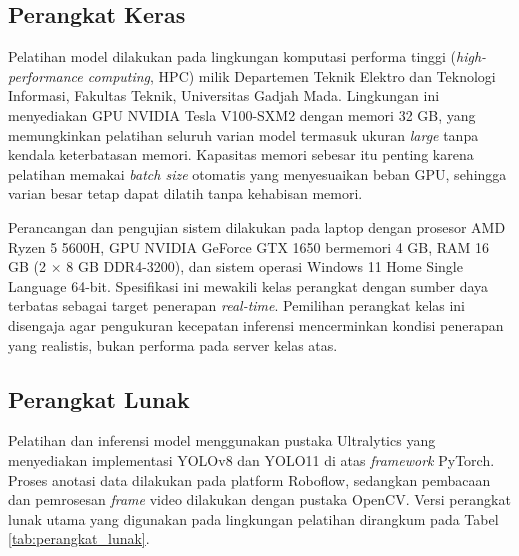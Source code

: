 \subsection{Perangkat Keras}

Pelatihan model dilakukan pada lingkungan komputasi performa tinggi 
(\textit{high-performance computing}, HPC) milik Departemen Teknik Elektro dan Teknologi 
Informasi, Fakultas Teknik, Universitas Gadjah Mada. Lingkungan ini menyediakan GPU NVIDIA 
Tesla V100-SXM2 dengan memori 32 GB, yang memungkinkan pelatihan seluruh varian model 
termasuk ukuran \textit{large} tanpa kendala keterbatasan memori. Kapasitas memori sebesar 
itu penting karena pelatihan memakai \textit{batch size} otomatis yang menyesuaikan beban 
GPU, sehingga varian besar tetap dapat dilatih tanpa kehabisan memori.

Perancangan dan pengujian sistem dilakukan pada laptop dengan prosesor AMD Ryzen 5 5600H, 
GPU NVIDIA GeForce GTX 1650 bermemori 4 GB, RAM 16 GB (2 $\times$ 8 GB DDR4-3200), dan 
sistem operasi Windows 11 Home Single Language 64-bit. Spesifikasi ini mewakili kelas 
perangkat dengan sumber daya terbatas sebagai target penerapan \textit{real-time}. Pemilihan 
perangkat kelas ini disengaja agar pengukuran kecepatan inferensi mencerminkan kondisi 
penerapan yang realistis, bukan performa pada server kelas atas.

\subsection{Perangkat Lunak}

Pelatihan dan inferensi model menggunakan pustaka Ultralytics yang menyediakan 
implementasi YOLOv8 dan YOLO11 di atas \textit{framework} PyTorch. Proses anotasi data 
dilakukan pada platform Roboflow, sedangkan pembacaan dan pemrosesan \textit{frame} 
video dilakukan dengan pustaka OpenCV. Versi perangkat lunak utama yang digunakan pada 
lingkungan pelatihan dirangkum pada Tabel \ref{tab:perangkat_lunak}.

